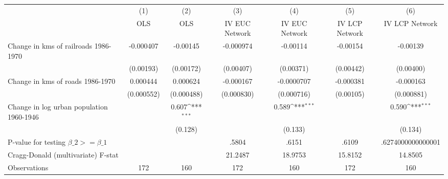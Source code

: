 {
\def\sym#1{\ifmmode^{#1}\else\(^{#1}\)\fi}
\begin{tabular}{l*{6}{c}}
\hline\hline
                &\multicolumn{1}{c}{(1)}&\multicolumn{1}{c}{(2)}&\multicolumn{1}{c}{(3)}&\multicolumn{1}{c}{(4)}&\multicolumn{1}{c}{(5)}&\multicolumn{1}{c}{(6)}\\
                &\multicolumn{1}{c}{OLS}&\multicolumn{1}{c}{OLS}&\multicolumn{1}{c}{IV EUC Network}&\multicolumn{1}{c}{IV EUC Network}&\multicolumn{1}{c}{IV LCP Network}&\multicolumn{1}{c}{IV LCP Network}\\
\hline
Change in kms of railroads 1986-1970&-0.000407         & -0.00145         &-0.000974         & -0.00114         & -0.00154         & -0.00139         \\
                &(0.00193)         &(0.00172)         &(0.00407)         &(0.00371)         &(0.00442)         &(0.00400)         \\
[1em]
Change in kms of roads 1986-1970& 0.000444         & 0.000624         &-0.000167         &-0.0000707         &-0.000381         &-0.000163         \\
                &(0.000552)         &(0.000488)         &(0.000830)         &(0.000716)         &(0.00105)         &(0.000881)         \\
[1em]
Change in log urban population 1960-1946&                  &    0.607\sym{***}&                  &    0.589\sym{***}&                  &    0.590\sym{***}\\
                &                  &  (0.128)         &                  &  (0.133)         &                  &  (0.134)         \\
\hline
P-value for testing $\beta\_{2} >= \beta\_{1}$&                  &                  &    .5804         &    .6151         &    .6109         &.6274000000000001         \\
Cragg-Donald (multivariate) F-stat&                  &                  &  21.2487         &  18.9753         &  15.8152         &  14.8505         \\
Observations    &      172         &      160         &      172         &      160         &      172         &      160         \\
\hline\hline
\end{tabular}
}
